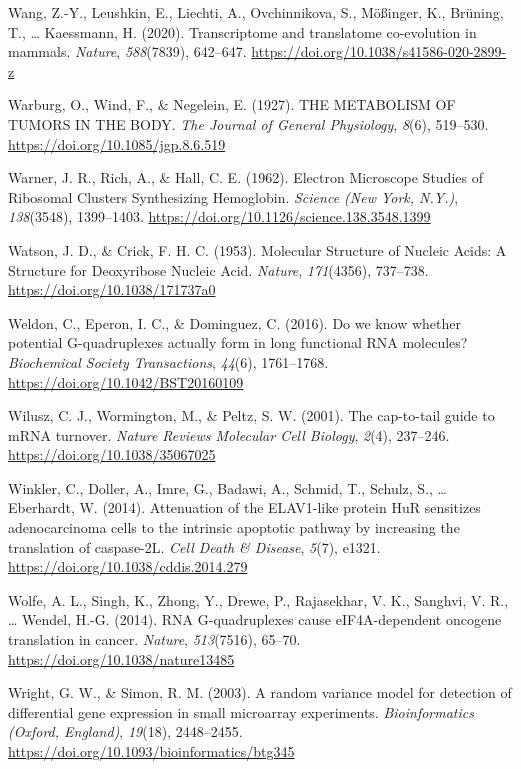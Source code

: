 \documentclass[12pt,openany]{book}
\begin{document}
\hypertarget{ref-Wang2020}{}
Wang, Z.-Y., Leushkin, E., Liechti, A., Ovchinnikova, S., Mößinger, K.,
Brüning, T., \ldots{} Kaessmann, H. (2020). Transcriptome and
translatome co-evolution in mammals. \emph{Nature}, \emph{588}(7839),
642--647. \url{https://doi.org/10.1038/s41586-020-2899-z}

\hypertarget{ref-Warburg1927}{}
Warburg, O., Wind, F., \& Negelein, E. (1927). THE METABOLISM OF TUMORS
IN THE BODY. \emph{The Journal of General Physiology}, \emph{8}(6),
519--530. \url{https://doi.org/10.1085/jgp.8.6.519}

\hypertarget{ref-Warner1962}{}
Warner, J. R., Rich, A., \& Hall, C. E. (1962). Electron Microscope
Studies of Ribosomal Clusters Synthesizing Hemoglobin. \emph{Science
(New York, N.Y.)}, \emph{138}(3548), 1399--1403.
\url{https://doi.org/10.1126/science.138.3548.1399}

\hypertarget{ref-Watson1953}{}
Watson, J. D., \& Crick, F. H. C. (1953). Molecular Structure of Nucleic
Acids: A Structure for Deoxyribose Nucleic Acid. \emph{Nature},
\emph{171}(4356), 737--738. \url{https://doi.org/10.1038/171737a0}

\hypertarget{ref-Weldon2016}{}
Weldon, C., Eperon, I. C., \& Dominguez, C. (2016). Do we know whether
potential G-quadruplexes actually form in long functional RNA molecules?
\emph{Biochemical Society Transactions}, \emph{44}(6), 1761--1768.
\url{https://doi.org/10.1042/BST20160109}

\hypertarget{ref-Wilusz2001}{}
Wilusz, C. J., Wormington, M., \& Peltz, S. W. (2001). The cap-to-tail
guide to mRNA turnover. \emph{Nature Reviews Molecular Cell Biology},
\emph{2}(4), 237--246. \url{https://doi.org/10.1038/35067025}

\hypertarget{ref-Winkler2014}{}
Winkler, C., Doller, A., Imre, G., Badawi, A., Schmid, T., Schulz, S.,
\ldots{} Eberhardt, W. (2014). Attenuation of the ELAV1-like protein HuR
sensitizes adenocarcinoma cells to the intrinsic apoptotic pathway by
increasing the translation of caspase-2L. \emph{Cell Death \& Disease},
\emph{5}(7), e1321. \url{https://doi.org/10.1038/cddis.2014.279}

\hypertarget{ref-Wolfe2014}{}
Wolfe, A. L., Singh, K., Zhong, Y., Drewe, P., Rajasekhar, V. K.,
Sanghvi, V. R., \ldots{} Wendel, H.-G. (2014). RNA G-quadruplexes cause
eIF4A-dependent oncogene translation in cancer. \emph{Nature},
\emph{513}(7516), 65--70. \url{https://doi.org/10.1038/nature13485}

\hypertarget{ref-Wright2003}{}
Wright, G. W., \& Simon, R. M. (2003). A random variance model for
detection of differential gene expression in small microarray
experiments. \emph{Bioinformatics (Oxford, England)}, \emph{19}(18),
2448--2455. \url{https://doi.org/10.1093/bioinformatics/btg345}
\end{document}
